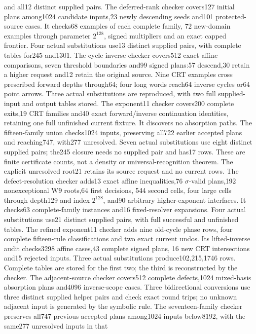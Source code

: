 \documentclass[11pt]{article}
\begin{document}
and all12 distinct supplied pairs. The deferred-rank checker covers127
initial plans among1024 candidate inputs,23 newly descending seeds and101
protected-source cases. It checks68 examples of each complete family,
72 new-domain examples through parameter $2^{128}$, signed multipliers
and an exact capped frontier. Four actual substitutions use13 distinct
supplied pairs, with complete tables for245 and1301.
The cycle-inverse checker covers512 exact affine comparisons, seven
threshold boundaries and99 signed plans:57 descend,30 retain a higher
request and12 retain the original source. Nine CRT examples cross
prescribed forward depths through64; four long words reach64 inverse
cycles or64 point arrows. Three actual substitutions are reproduced,
with two full supplied-input and output tables stored.
The exponent11 checker covers200 complete exits,19 CRT families and40
exact forward/inverse continuation identities, retaining one full
unfinished current fixture. It discovers no absorption paths.
The fifteen-family union checks1024 inputs, preserving all722 earlier
accepted plans and reaching747, with277 unresolved. Seven actual
substitutions use eight distinct supplied pairs; the245 closure needs
no supplied pair and has17 rows. These are finite certificate counts,
not a density or universal-recognition theorem. The explicit unresolved
root21 retains its source request and no current rows.
The defect-resolution checker adds13 exact affine inequalities,76
$\sigma$-valid plans,192 nonexceptional W9 roots,64 first decisions,
544 second cells, four large cells through depth129 and index $2^{128}$,
and90 arbitrary higher-exponent interfaces. It checks63 complete-family
instances and16 fixed-resolver expansions. Four actual substitutions
use21 distinct supplied pairs, with full successful and unfinished tables.
The refined exponent11 checker adds nine old-cycle phase rows, four
complete fifteen-rule classifications and two exact current undos.
Its lifted-inverse audit checks3298 affine cases,43 complete signed plans,
16 new CRT intersections and15 rejected inputs. Three actual substitutions
produce102,215,1746 rows. Complete tables are stored for the first two;
the third is reconstructed by the checker.
The adjacent-source checker covers512 complete defects,1024 mixed-basis
absorption plans and4096 inverse-scope cases. Three bidirectional
conversions use three distinct supplied helper pairs and check exact
round trips; no unknown adjacent input is generated by the symbolic rule.
The seventeen-family checker preserves all747 previous accepted plans
among1024 inputs below8192, with the same277 unresolved inputs in that
\end{document}
